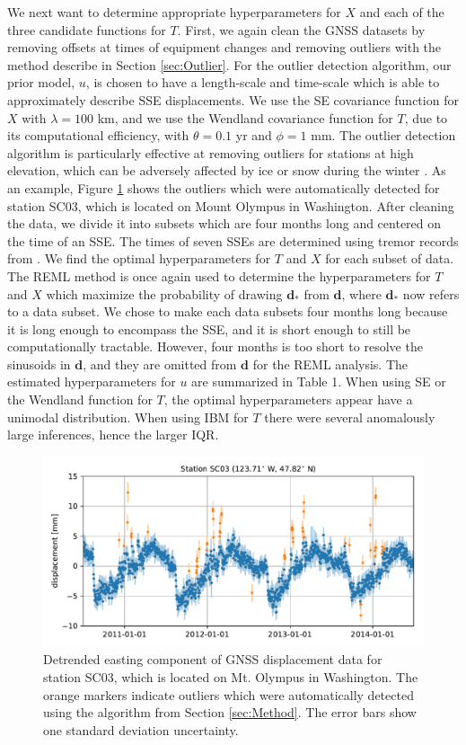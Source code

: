 \documentclass[10pt,a4paper]{article}
\begin{document}
We next want to determine appropriate hyperparameters for $X$ and each of the three candidate functions for $T$. First, we again clean the GNSS datasets by removing offsets at times of equipment changes and removing outliers with the method describe in Section \ref{sec:Outlier}. For the outlier detection algorithm, our prior model, $u$, is chosen to have a length-scale and time-scale which is able to approximately describe SSE displacements. We use the SE covariance function for $X$ with $\lambda = 100$ km, and we use the Wendland covariance function for $T$, due to its computational efficiency, with $\theta = 0.1$ yr and $\phi = 1$ mm. The outlier detection algorithm is particularly effective at removing outliers for stations at high elevation, which can be adversely affected by ice or snow during the winter \citep{Lisowski2008}. As an example, Figure \ref{fig:Outliers} shows the outliers which were automatically detected for station SC03, which is located on Mount Olympus in Washington.  After cleaning the data, we divide it into subsets which are four months long and centered on the time of an SSE. The times of seven SSEs are determined using tremor records from \cite{Wech2010}. We find the optimal hyperparameters for $T$ and $X$ for each subset of data. The REML method is once again used to determine the hyperparameters for $T$ and $X$ which maximize the probability of drawing $\bm{d}_*$ from $\bm{d}$, where $\bm{d}_*$ now refers to a data subset. We chose to make each data subsets four months long because it is long enough to encompass the SSE, and it is short enough to still be computationally tractable. However, four months is too short to resolve the sinusoids in $\bm{d}$, and they are omitted from $\bm{d}$ for the REML analysis. The estimated hyperparameters for $u$ are summarized in Table 1. When using SE or the Wendland function for $T$, the optimal hyperparameters appear have a unimodal distribution. When using IBM for $T$ there were several anomalously large inferences, hence the larger IQR.   

\begin{figure}
\includegraphics{figures/outliers/outliers.pdf}
\caption{Detrended easting component of GNSS displacement data for station SC03, which is located on Mt. Olympus in Washington.  The orange markers indicate outliers which were automatically detected using the algorithm from Section \ref{sec:Method}. The error bars show one standard deviation uncertainty.}   
\label{fig:Outliers}
\end{figure}
\end{document}
